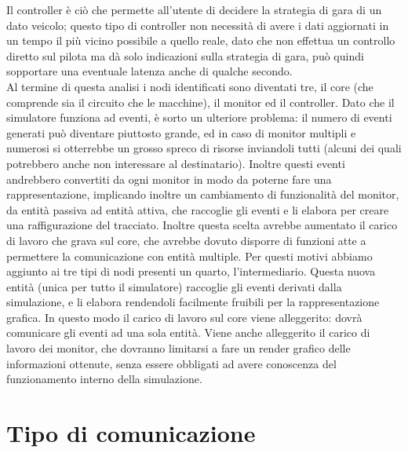 Il controller è ciò che permette all’utente di decidere la strategia di gara di un dato veicolo; questo tipo di controller non necessità di avere i dati aggiornati in un tempo il più vicino possibile a quello reale, dato che non effettua un controllo diretto sul pilota ma dà solo indicazioni sulla strategia di gara, può quindi sopportare una eventuale latenza anche di qualche secondo. \\

Al termine di questa analisi i nodi identificati sono diventati tre, il core (che comprende sia il circuito che le macchine), il monitor ed il controller.
Dato che il simulatore funziona ad eventi, è sorto un ulteriore problema: il numero di eventi generati può diventare piuttosto grande, ed in caso di monitor multipli e numerosi si otterrebbe un grosso spreco di risorse inviandoli tutti (alcuni dei quali potrebbero anche non interessare al destinatario). Inoltre questi eventi andrebbero convertiti da ogni monitor in modo da poterne fare una rappresentazione, implicando inoltre un cambiamento di funzionalità del monitor, da entità passiva ad entità attiva, che raccoglie gli eventi e li elabora per creare una raffigurazione del tracciato.
Inoltre questa scelta avrebbe aumentato il carico di lavoro che grava sul core,  che avrebbe dovuto disporre di funzioni atte a permettere la comunicazione con entità multiple.
Per questi motivi abbiamo aggiunto ai tre tipi di nodi presenti un quarto, l’intermediario. Questa nuova entità (unica per tutto il simulatore) raccoglie gli eventi derivati dalla simulazione, e li elabora rendendoli facilmente fruibili per la rappresentazione grafica. In questo modo il carico di lavoro sul core viene alleggerito: dovrà comunicare gli eventi ad una sola entità. Viene anche alleggerito il carico di lavoro dei monitor, che dovranno limitarsi a fare un render grafico delle informazioni ottenute, senza essere obbligati ad avere conoscenza del funzionamento interno della simulazione.

\section{Tipo di comunicazione}

